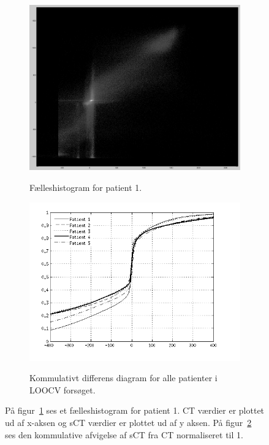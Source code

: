 \begin{figure}[H]
    \centering
    \begin{subfigure}[b]{0.47\textwidth}
    	\caption{Fælleshistogram for patient 1.}
        \includegraphics[width=1\textwidth]{billeder/loocv_joint_histogram.png}
        \label{fig:loocv_j_h}
    \end{subfigure}\hfill
    \begin{subfigure}[b]{0.47\textwidth}
        \caption{Kommulativt differens diagram for alle patienter i LOOCV forsøget.}
        \includegraphics[width=1\textwidth]{billeder/cumm_diff_loocv.png}
        \label{fig:cumm_diff_loocv}
    \end{subfigure}
    \caption{På figur~\ref{fig:loocv_j_h} ses et fælleshistogram for patient 1. CT værdier er plottet ud af x-aksen og sCT værdier er plottet ud af y aksen. På figur~\ref{fig:cumm_diff_loocv} ses den kommulative afvigelse af sCT fra CT normaliseret til 1.}
    \label{fig:loocv}
\end{figure}

